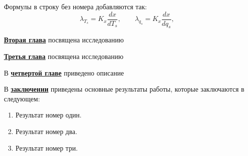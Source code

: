 Формулы в строку без номера добавляются так:
$$
  \lambda_{T_s} = K_x\frac{d{x}}{d{T_s}}, \qquad
  \lambda_{q_s} = K_x\frac{d{x}}{d{q_s}},
$$

\underline{\textbf{Вторая глава}} посвящена исследованию 

\underline{\textbf{Третья глава}} посвящена исследованию 

В \underline{\textbf{четвертой главе}} приведено описание 

В \underline{\textbf{заключении}} приведены основные результаты работы, которые заключаются в следующем:
\begin{enumerate}
 \item Результат номер один.
 \item Результат номер два.
 \item Результат номер три.
\end{enumerate}


\renewcommand{\refname}{\Large Публикации автора по теме диссертации}
\nocite{*}
